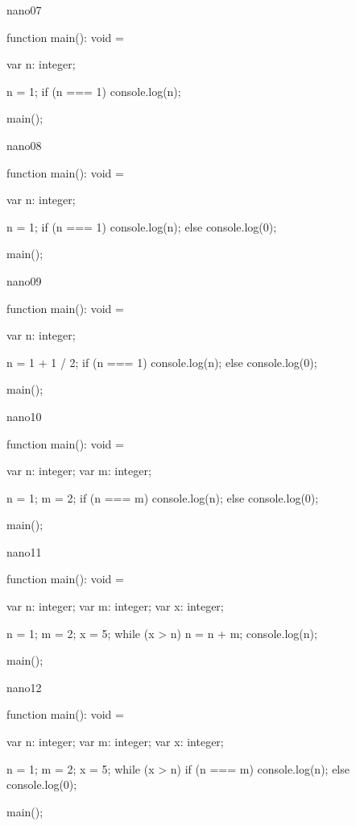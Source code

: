 \documentclass[12pt,a4paper,twoside]{article}
\begin{document}
nano07
\begin{terminal}
    function main(): void = {
        var n: integer;
        
        n = 1;
        if (n === 1) {
            console.log(n);
        }
    }
    
    main();
\end{terminal}
nano08
\begin{terminal}
    function main(): void = {
        var n: integer;
        
        n = 1;
        if (n === 1) {
            console.log(n);
        } else {
            console.log(0);
        }
    }
    
    main();
\end{terminal}
nano09
\begin{terminal}
    function main(): void = {
        var n: integer;
        
        n = 1 + 1 / 2;
        if (n === 1) {
            console.log(n);
        } else {
            console.log(0);
        }
    }
    
    main();
\end{terminal}
nano10
\begin{terminal}
    function main(): void = {
        var n: integer;
        var m: integer;
        
        n = 1;
        m = 2;
        if (n === m) {
            console.log(n);
        } else {
            console.log(0);
        }
    }
    
    main();
\end{terminal}
nano11
\begin{terminal}
    function main(): void = {
        var n: integer;
        var m: integer;
        var x: integer;
        
        n = 1;
        m = 2;
        x = 5;
        while (x > n) {
            n = n + m;
            console.log(n);
        }
    }
    
    main();
\end{terminal}
nano12
\begin{terminal}
    function main(): void = {
        var n: integer;
        var m: integer;
        var x: integer;
        
        n = 1;
        m = 2;
        x = 5;
        while (x > n) {
            if (n === m) {
                console.log(n);
            } else {
                console.log(0);
            }
        }
    }
    
    main();
\end{terminal}
\end{document}
